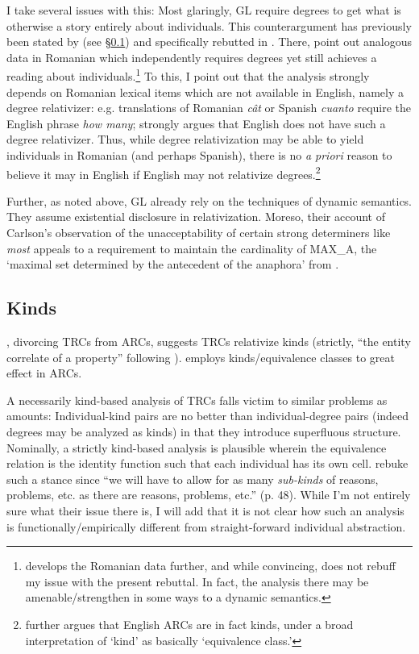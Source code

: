 \documentclass[11pt]{article}
\begin{document}
I take several issues with this: Most glaringly, GL require degrees to get what is otherwise a story entirely about individuals. This counterargument has previously been stated by \citet{mcnallyDPInternalOnlyAmount2008} (see \S\ref{sec:kinds}) and specifically rebutted in \citet{grosuEntitydenotingAmountRelatives2015}. There, \citeauthor{grosuEntitydenotingAmountRelatives2015} point out analogous data in Romanian which independently requires degrees yet still achieves a reading about individuals.\footnote{\citet{grosuSelectedAspectsAmount2015} develops the Romanian data further, and while convincing, does not rebuff my issue with the present rebuttal. In fact, the analysis there may be amenable/strengthen in some ways to a dynamic semantics.} To this, I point out that the analysis strongly depends on Romanian lexical items which are not available in English, namely a degree relativizer: e.g. translations of Romanian \textit{c\^at} or Spanish \textit{cuanto} require the English phrase \textit{how many}; \citet{mendiaAmountRelativesRedux2017} strongly argues that English does not have such a degree relativizer. Thus, while degree relativization may be able to yield individuals in Romanian (and perhaps Spanish), there is no \textit{a priori} reason to believe it may in English if English may not relativize degrees.\footnote{\citet{mendiaAmountRelativesRedux2017} further argues that English ARCs are in fact kinds, under a broad interpretation of `kind' as basically `equivalence class.'}

Further, as noted above, GL already rely on the techniques of dynamic semantics. They assume existential disclosure in relativization. Moreso, their account of Carlson's observation of the unacceptability of certain strong determiners like \textit{most} appeals to a requirement to maintain the cardinality of MAX_A, the `maximal set determined by the antecedent of the anaphora' from \citet{kadmonUniqueNonuniqueReference1992}.

\subsection{Kinds}\label{sec:kinds}
\citet{mcnallyDPInternalOnlyAmount2008}, divorcing TRCs from ARCs, suggests TRCs relativize kinds (strictly, ``the entity correlate of a property'' following \cite{mcnallyInterpretationEnglishExistential1992}). \citet{mendiaAmountRelativesRedux2017} employs kinds/equivalence classes to great effect in ARCs.

A necessarily kind-based analysis of TRCs falls victim to similar problems as amounts: Individual-kind pairs are no better than individual-degree pairs (indeed degrees may be analyzed as kinds) in that they introduce superfluous structure. Nominally, a strictly kind-based analysis is plausible wherein the equivalence relation is the identity function such that each individual has its own cell. \citet{grosuAmountRelatives2017} rebuke such a stance since ``we will have to allow for as many \textit{sub-kinds} of reasons, problems, etc. as there are reasons, problems, etc.'' (p. 48). While I'm not entirely sure what their issue there is, I will add that it is not clear how such an analysis is functionally/empirically different from straight-forward individual abstraction.
\end{document}
